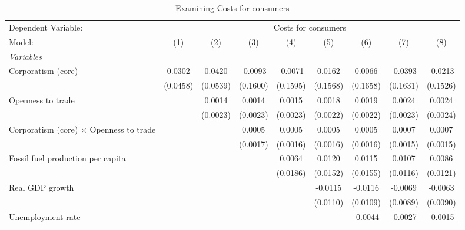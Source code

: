 
\begin{table}[htbp]
   \caption{Examining Costs for consumers}
   \centering
   \begin{tabular}{lcccccccc}
      \tabularnewline \midrule \midrule
      Dependent Variable: & \multicolumn{8}{c}{Costs for consumers}\\
      Model:                                         & (1)      & (2)      & (3)      & (4)      & (5)      & (6)      & (7)      & (8)\\  
      \midrule
      \emph{Variables}\\
      Corporatism (core)                             & 0.0302   & 0.0420   & -0.0093  & -0.0071  & 0.0162   & 0.0066   & -0.0393  & -0.0213\\   
                                                     & (0.0458) & (0.0539) & (0.1600) & (0.1595) & (0.1568) & (0.1658) & (0.1631) & (0.1526)\\   
      Openness to trade                              &          & 0.0014   & 0.0014   & 0.0015   & 0.0018   & 0.0019   & 0.0024   & 0.0024\\   
                                                     &          & (0.0023) & (0.0023) & (0.0023) & (0.0022) & (0.0022) & (0.0023) & (0.0024)\\   
      Corporatism (core) $\times$ Openness to trade  &          &          & 0.0005   & 0.0005   & 0.0005   & 0.0005   & 0.0007   & 0.0007\\   
                                                     &          &          & (0.0017) & (0.0016) & (0.0016) & (0.0016) & (0.0015) & (0.0015)\\   
      Fossil fuel production per capita              &          &          &          & 0.0064   & 0.0120   & 0.0115   & 0.0107   & 0.0086\\   
                                                     &          &          &          & (0.0186) & (0.0152) & (0.0155) & (0.0116) & (0.0121)\\   
      Real GDP growth                                &          &          &          &          & -0.0115  & -0.0116  & -0.0069  & -0.0063\\   
                                                     &          &          &          &          & (0.0110) & (0.0109) & (0.0089) & (0.0090)\\   
      Unemployment rate                              &          &          &          &          &          & -0.0044  & -0.0027  & -0.0015\\   

\end{tabular}
\end{table}
